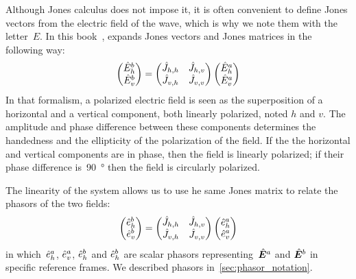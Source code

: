 Although Jones calculus does not impose it, it is often convenient to define Jones vectors from the electric field of the wave, which is why we note them with the letter~$E$.
In this book~, \citeauthor{hecht2002optics} expands Jones vectors and Jones matrices in the following way:
\begin{equation}
    \begin{pmatrix}
        \hat{E}^b_h\\
        \hat{E}^b_v
    \end{pmatrix}
    =
    \begin{pmatrix}
        \hat{J}_{h, h}   &   \hat{J}_{h, v} \\
        \hat{J}_{v, h}   &   \hat{J}_{v, v}
    \end{pmatrix}
    \begin{pmatrix}
        \hat{E}^a_h\\
        \hat{E}^a_v
    \end{pmatrix}
    \label{eq:jones_matrix_2d}
\end{equation}
In that formalism,
a polarized electric field is seen as the superposition of a horizontal and a vertical component, both linearly polarized, noted $h$ and $v$.
The amplitude and phase difference between these components determines the handedness and the ellipticity of the polarization of the field.
If the the horizontal and vertical components are in phase, then the field is linearly polarized; if their phase difference is~\SI{90}{\degree} then the field is circularly polarized.

The linearity of the system allows us to use he same Jones matrix to relate the phasors of the two fields:
\begin{equation}
    \begin{pmatrix}
        \hat{e}^b_h\\
        \hat{e}^b_v
    \end{pmatrix}
    =
    \begin{pmatrix}
        \hat{J}_{h, h}   &   \hat{J}_{h, v} \\
        \hat{J}_{v, h}   &   \hat{J}_{v, v}
    \end{pmatrix}
    \begin{pmatrix}
        \hat{e}^a_h\\
        \hat{e}^a_v
    \end{pmatrix}
\end{equation}
in which~$\hat{e}^a_h$, $\hat{e}^a_v$, $\hat{e}^b_h$ and $\hat{e}^b_h$ are scalar phasors
representing~$\hat{\bm{E}}^a$ and $\hat{\bm{E}}^b$ in specific reference frames.
We described phasors in~\vref{sec:phasor_notation}.

